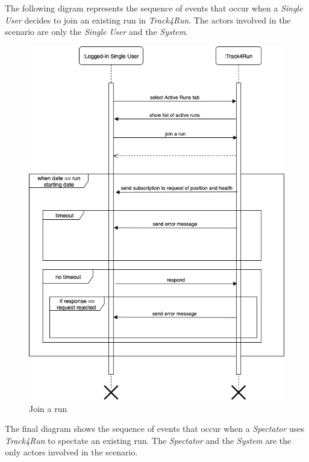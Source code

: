 \documentclass[titlepage]{article}
\begin{document}
The following digram represents the sequence of events that occur when a {\it Single User} decides to join an existing run in {\it Track4Run}. The actors involved in the scenario are only the {\it Single User} and the {\it System}.
\begin{figure}[H]
			\center
  			\includegraphics[width=\textwidth]{Diagrammi/sd7.png}
			\caption{Join a run}
			\label{fig:sd7}
\end{figure}
The final diagram shows the sequence of events that occur when a {\it Spectator} uses {\it Track4Run} to spectate an existing run. The {\it Spectator} and the {\it System} are the only actors involved in the scenario.
\end{document}
